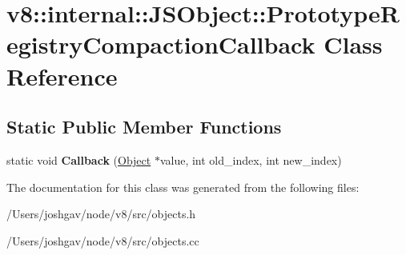 \hypertarget{classv8_1_1internal_1_1_j_s_object_1_1_prototype_registry_compaction_callback}{}\section{v8\+:\+:internal\+:\+:J\+S\+Object\+:\+:Prototype\+Registry\+Compaction\+Callback Class Reference}
\label{classv8_1_1internal_1_1_j_s_object_1_1_prototype_registry_compaction_callback}
\subsection*{Static Public Member Functions}
\begin{DoxyCompactItemize}
\item 
static void {\bfseries Callback} (\hyperlink{classv8_1_1internal_1_1_object}{Object} $\ast$value, int old\+\_\+index, int new\+\_\+index)\hypertarget{classv8_1_1internal_1_1_j_s_object_1_1_prototype_registry_compaction_callback_a654010e20754d157581364abdc1d1d8e}{}\label{classv8_1_1internal_1_1_j_s_object_1_1_prototype_registry_compaction_callback_a654010e20754d157581364abdc1d1d8e}

\end{DoxyCompactItemize}


The documentation for this class was generated from the following files\+:\begin{DoxyCompactItemize}
\item 
/\+Users/joshgav/node/v8/src/objects.\+h\item 
/\+Users/joshgav/node/v8/src/objects.\+cc\end{DoxyCompactItemize}
